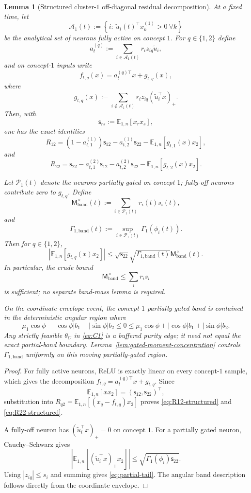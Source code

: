 \documentclass{article} %
\theoremstyle{plain}
\newtheorem{lemma}[theorem]{Lemma}
\theoremstyle{definition}
\theoremstyle{remark}
\begin{document}
\begin{lemma}[Structured cluster-$1$ off-diagonal residual decomposition]
\label{lem:structured-cluster1-offdiag}
At a fixed time, let
\[
\mathcal A_1(t)
:=
\left\{
i:\
\widetilde u_i(t)^\top x_k^{(1)}>0
\ \forall k
\right\}
\]
be the analytical set of neurons fully active on concept $1$.  For
$q\in\{1,2\}$ define
\[
\boxed{
a_t^{(q)}
:=
\sum_{i\in\mathcal A_1(t)}
r_i z_{iq}\widetilde u_i,
}
\]
and on concept-$1$ inputs write
\[
\boxed{
f_{t,q}(x)
=
a_t^{(q)\top}x
+
g_{t,q}(x),
}
\]
where
\[
g_{t,q}(x)
:=
\sum_{i\notin\mathcal A_1(t)}
r_iz_{iq}(\widetilde u_i^\top x)_+.
\]
Then, with
\[
\mathsf s_{rs}
:=
\mathbb E_{1,n}[x_rx_s],
\]
one has the exact identities
\[
\boxed{
R_{12}
=
(1-a_{t,1}^{(1)})\mathsf s_{12}
-
a_{t,2}^{(1)}\mathsf s_{22}
-
\mathbb E_{1,n}[g_{t,1}(x)x_2],
}
\tag{R12-structured}\label{eq:R12-structured}
\]
and
\[
\boxed{
R_{22}
=
\mathsf s_{22}
-
a_{t,1}^{(2)}\mathsf s_{12}
-
a_{t,2}^{(2)}\mathsf s_{22}
-
\mathbb E_{1,n}[g_{t,2}(x)x_2].
}
\tag{R22-structured}\label{eq:R22-structured}
\]

Let $\mathcal P_1(t)$ denote the neurons partially gated on concept $1$;
fully-off neurons contribute zero to $g_{t,q}$.  Define
\[
\mathsf M_{\mathrm{band}}^\times(t)
:=
\sum_{i\in\mathcal P_1(t)}r_i(t)s_i(t),
\]
and
\[
\Gamma_{1,\mathrm{band}}(t)
:=
\sup_{i\in\mathcal P_1(t)}\Gamma_1(\phi_i(t)).
\]
Then for $q\in\{1,2\}$,
\[
\boxed{
\left|
\mathbb E_{1,n}[g_{t,q}(x)x_2]
\right|
\le
\sqrt{\mathsf s_{22}}
\sqrt{\Gamma_{1,\mathrm{band}}(t)}
\mathsf M_{\mathrm{band}}^\times(t).
}
\tag{partial-tail}\label{eq:partial-tail}
\]
In particular, the crude bound
\[
\mathsf M_{\mathrm{band}}^\times
\le
\sum_i r_is_i
\]
is sufficient; no separate band-mass lemma is required.

On the coordinate-envelope event, the concept-$1$ partially-gated band is
contained in the deterministic angular region where
\[
\mu_1\cos\phi-|\cos\phi|b_1-|\sin\phi|b_2
\le0\le
\mu_1\cos\phi+|\cos\phi|b_1+|\sin\phi|b_2.
\]
Any strictly feasible $\theta_C$ in \eqref{eq:C1} is a buffered
purity edge; it need not equal the exact partial-band boundary.  Lemma~\ref{lem:gated-moment-concentration} controls
$\Gamma_{1,\mathrm{band}}$ uniformly on this moving partially-gated region.
\end{lemma}

\begin{proof}
For fully active neurons, ReLU is exactly linear on every concept-$1$ sample,
which gives the decomposition $f_{t,q}=a_t^{(q)\top}x+g_{t,q}$.  Since
\[
\mathbb E_{1,n}[xx_2]
=
(\mathsf s_{12},\mathsf s_{22})^\top,
\]
substitution into
$R_{q2}=\mathbb E_{1,n}[(x_q-f_{t,q})x_2]$ proves
\eqref{eq:R12-structured} and \eqref{eq:R22-structured}.

A fully-off neuron has $(\widetilde u_i^\top x)_+=0$ on concept $1$.  For a
partially gated neuron, Cauchy--Schwarz gives
\[
\left|
\mathbb E_{1,n}
[(\widetilde u_i^\top x)_+x_2]
\right|
\le
\sqrt{\Gamma_1(\phi_i)\mathsf s_{22}}.
\]
Using $|z_{iq}|\le s_i$ and summing gives \eqref{eq:partial-tail}.  The angular
band description follows directly from the coordinate envelope.
\end{proof}
\end{document}
